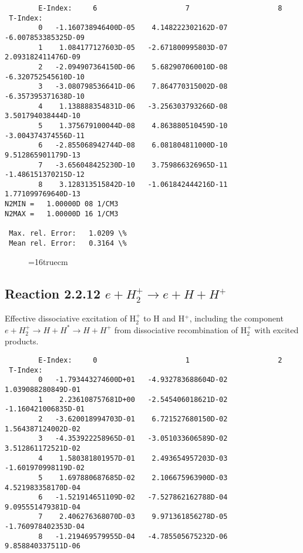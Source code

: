 \documentclass[12pt,dvipdfmx]{article}
\begin{document}
{\begin{small}
\begin{verbatim}
        E-Index:     6                     7                     8
 T-Index:
        0   -1.160738946400D-05    4.148222302162D-07   -6.007853385325D-09
        1    1.084177127603D-05   -2.671800995803D-07    2.093182411476D-09
        2   -2.094907364150D-06    5.682907060010D-08   -6.320752545610D-10
        3   -3.080798536641D-06    7.864770315002D-08   -6.357395371638D-10
        4    1.138888354831D-06   -3.256303793266D-08    3.501794038444D-10
        5    1.375679100044D-08    4.863880510459D-10   -3.004374374556D-11
        6   -2.855068942744D-08    6.081804811000D-10    9.512865901179D-13
        7   -3.656048425230D-10    3.759866326965D-11   -1.486151370215D-12
        8    3.128313515842D-10   -1.061842444216D-11    1.771099769640D-13
N2MIN =   1.00000D 08 1/CM3
N2MAX =   1.00000D 16 1/CM3

 Max. rel. Error:   1.0209 \%
 Mean rel. Error:   0.3164 \%

\end{verbatim}\end{small}
\begin{figure} \label{2.2.11}
\epsfxsize=16truecm
\end{figure}
\newpage




\subsection{
Reaction 2.2.12 $  e + H_2^+   \rightarrow  e + H + H^+  $
}
Effective dissociative excitation of H$_2^+$ to H and H$^+$, including the
component $e+H_2^+ \rightarrow H + H^* \rightarrow H + H^+$ from dissociative recombination of H$_2^+$ with excited products.

\begin{small}\begin{verbatim}
        E-Index:     0                     1                     2
 T-Index:
        0   -1.793443274600D+01   -4.932783688604D-02    1.039088280849D-01
        1    2.236108757681D+00   -2.545406018621D-02   -1.160421006835D-01
        2   -3.620018994703D-01    6.721527680150D-02    1.564387124002D-02
        3   -4.353922258965D-01   -3.051033606589D-02    3.512861172521D-02
        4    1.580381801957D-01    2.493654957203D-03   -1.601970998119D-02
        5    1.697880687685D-02    2.106675963900D-03    4.521983358170D-04
        6   -1.521914651109D-02   -7.527862162788D-04    9.095551479381D-04
        7    2.406276368070D-03    9.971361856278D-05   -1.760978402353D-04
        8   -1.219469579955D-04   -4.785505675232D-06    9.858840337511D-06


\end{verbatim}
\end{small}}
\end{document}
